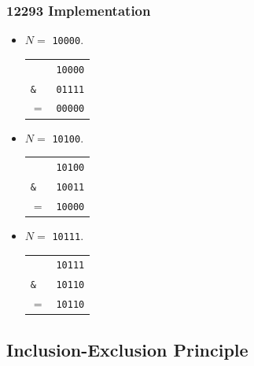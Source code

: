 \documentclass{beamer}
\begin{document}
\begin{frame}%
\frametitle{12293 Implementation}
\scriptsize

\begin{itemize}
\item $N =$ \texttt{10000}.\\
\begin{center}
\begin{tabular}{ll}
& \texttt{10000}\\
\texttt{\&} & \texttt{01111}\\
\hline
$=$ & \texttt{00000}\\
\end{tabular}
\end{center}

\vspace{0.2cm}

\item<2-> $N =$ \texttt{10100}.\\
\begin{center}
\begin{tabular}{ll}
& \texttt{10100}\\
\texttt{\&} & \texttt{10011}\\
\hline
$=$ & \texttt{10000}\\
\end{tabular}
\end{center}

\vspace{0.2cm}

\item<3-> $N =$ \texttt{10111}.\\
\begin{center}
\begin{tabular}{ll}
& \texttt{10111}\\
\texttt{\&} & \texttt{10110}\\
\hline
$=$ & \texttt{10110}\\
\end{tabular}
\end{center}

\end{itemize}

\end{frame}

\fi

\subsection{Inclusion-Exclusion Principle}
\end{document}
